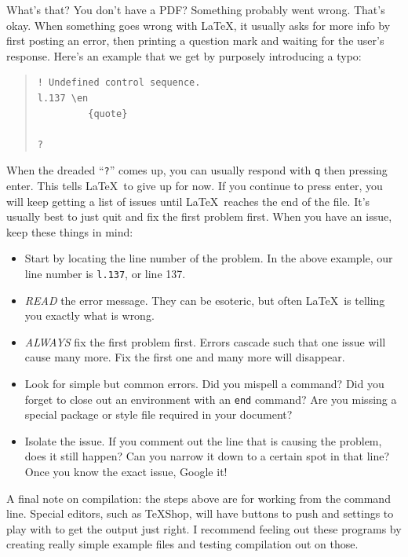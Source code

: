 \documentclass[12pt, letterpaper]{article}
\begin{document}
What's that?  You don't have a PDF?  Something probably went wrong.  That's
okay.  When something goes wrong with \LaTeX , it usually asks for more info
by first posting an error, then printing a question mark and waiting for the
user's response.  Here's an example that we get by purposely introducing a
typo:
\begin{quote}
\begin{verbatim}
! Undefined control sequence.
l.137 \en
         {quote}

?
\end{verbatim}
\end{quote}

When the dreaded ``{\tt ?}'' comes up, you can usually respond with {\tt q} then
pressing enter.  This tells \LaTeX \ to give up for now.  If you continue to
press enter, you will keep getting a list of issues until \LaTeX \ reaches the
end of the file.  It's usually best to just quit and fix the first problem
first.  When you have an issue, keep these things in mind:

\begin{itemize}
\item Start by locating the line number of the problem.  In the above example,
  our line number is {\tt l.137}, or line 137.
\item \emph{READ} the error message.  They can be esoteric, but often \LaTeX \
  is telling you exactly what is wrong.
\item \emph{ALWAYS} fix the first problem first.  Errors cascade such that one
  issue will cause many more.  Fix the first one and many more will disappear.
\item Look for simple but common errors.  Did you mispell a command?  Did you
  forget to close out an environment with an {\tt end} command?  Are you
  missing a special package or style file required in your document?
\item Isolate the issue. If you comment out the line that is causing the
  problem, does it still happen?  Can you narrow it down to a certain spot
  in that line?  Once you know the exact issue, Google it!
\end{itemize}

A final note on compilation: the steps above are for working from the command
line.  Special editors, such as TeXShop, will have buttons to push and
settings to play with to get the output just right.  I recommend feeling out
these programs by creating really simple example files and testing compilation
out on those.
\end{document}
